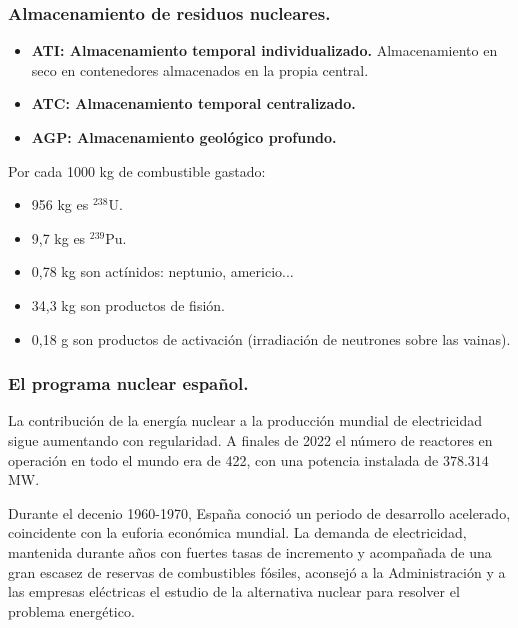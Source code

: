		\subsubsection{Almacenamiento de residuos nucleares.}
			\begin{itemize}
				\item \textbf{ATI: Almacenamiento temporal individualizado.} Almacenamiento en seco en contenedores almacenados en la propia central.
				\item \textbf{ATC: Almacenamiento temporal centralizado.}
				\item \textbf{AGP: Almacenamiento geológico profundo.}
			\end{itemize}
			
			Por cada 1000 kg de combustible gastado:
			\begin{itemize}
				\item 956 kg es $^{238}$U.
				\item 9,7 kg es $^{239}$Pu.
				\item 0,78 kg son actínidos: neptunio, americio...
				\item 34,3 kg son productos de fisión.
				\item 0,18 g son productos de activación (irradiación de neutrones sobre las vainas).
			\end{itemize}
			
		\subsubsection{El programa nuclear español.}
			La contribución de la energía nuclear a la
			producción mundial de electricidad sigue
			aumentando con regularidad. A finales de 2022 el número de reactores en
			operación en todo el mundo era de 422, con
			una potencia instalada de $378.314$ MW.
			
			
			Durante el decenio 1960-1970, España conoció un periodo de desarrollo acelerado, coincidente con la euforia económica mundial. La demanda de electricidad, mantenida durante años con fuertes tasas de incremento y acompañada de una gran escasez de reservas de combustibles fósiles, aconsejó a la Administración y a las empresas eléctricas el estudio de la alternativa nuclear para resolver el problema energético.
			
